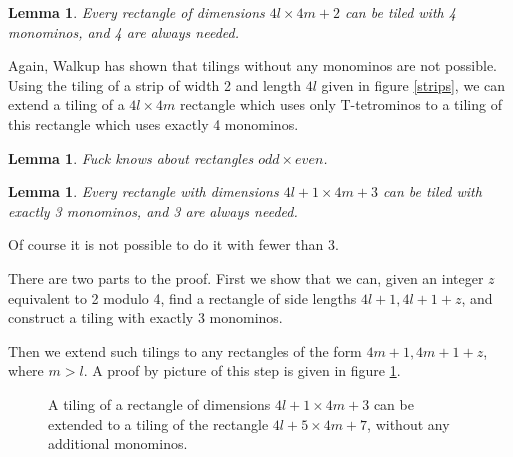 \documentclass{article}
\theoremstyle{plain}
\newtheorem{lemma}[theorem]{Lemma}
\begin{document}
\begin{lemma}
Every rectangle of dimensions $4l \times 4m + 2$ can be tiled with 4 monominos, and 4 are always needed.
\end{lemma}
Again, Walkup has shown that tilings without any monominos are not possible. Using the tiling of a strip of width 2 and length $4l$ given in figure \ref{strips}, we can extend a tiling of a $4l \times 4m$ rectangle which uses only T-tetrominos to a tiling of this rectangle which uses exactly 4 monominos.

\begin{lemma}
Fuck knows about rectangles $odd \times even$.
\end{lemma}

\begin{lemma}
Every rectangle with dimensions $4l + 1 \times 4m + 3$ can be tiled with exactly 3 monominos, and 3 are always needed.
\end{lemma}
Of course it is not possible to do it with fewer than 3.

There are two parts to the proof. First we show that we can, given an integer $z$ equivalent to 2 modulo 4, find a rectangle of side lengths $4l + 1, 4l + 1 + z$, and construct a tiling with exactly 3 monominos. 

Then we extend such tilings to any rectangles of the form $4m + 1, 4m + 1 + z$, where $m > l$. A proof by picture of this step is given in figure \ref{extending}.

\begin{figure}

\caption{A tiling of a rectangle of dimensions $4l + 1 \times 4m + 3$ can be extended to a tiling of the rectangle $4l + 5 \times 4m + 7$, without any additional monominos.}
\label{extending}
\end{figure}


{}

\end{document}
